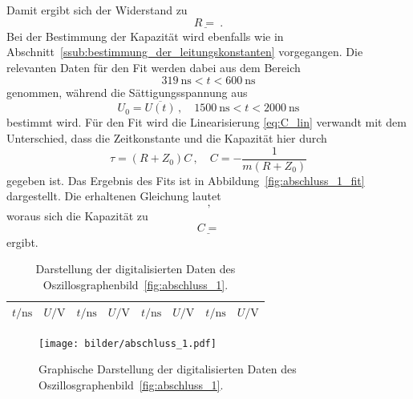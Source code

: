 Damit ergibt sich der Widerstand zu
\begin{equation}
  \underline{R = }~.
\end{equation}
Bei der Bestimmung der Kapazität wird ebenfalls wie in
Abschnitt~\ref{ssub:bestimmung_der_leitungskonstanten} vorgegangen.
Die relevanten Daten für den Fit werden dabei aus dem Bereich
\begin{equation}
  \SI{319}{\nano\second} < t < \SI{600}{\nano\second}
\end{equation}
genommen, während die Sättigungsspannung aus
\begin{equation}
  U_0 = \overline{U(t)}\,,\quad
  \SI{1500}{\nano\second} < t < \SI{2000}{\nano\second}
\end{equation}
bestimmt wird.
Für den Fit wird die Linearisierung \eqref{eq:C_lin} verwandt mit dem
Unterschied, dass die Zeitkonstante und die Kapazität hier durch
\begin{equation}
  \tau = (R + Z_0) C\,,\quad C = - \frac{1}{m (R + Z_0)}
\end{equation}
gegeben ist.
Das Ergebnis des Fits ist in Abbildung~\ref{fig:abschluss_1_fit} dargestellt.
Die erhaltenen Gleichung lautet
\begin{equation}
  ~,
\end{equation}
woraus sich die Kapazität zu
\begin{equation}
  \underline{C = }
\end{equation}
ergibt.

\begin{table}[htpb]
  \centering
  \begin{tabular}{cc|cc|cc|cc}
    \midrule
    \midrule
    $t/\si{\nano\second}$ & $U/\si{\volt}$ &
    $t/\si{\nano\second}$ & $U/\si{\volt}$ &
    $t/\si{\nano\second}$ & $U/\si{\volt}$ &
    $t/\si{\nano\second}$ & $U/\si{\volt}$ \\
    \midrule
    
    \midrule
    \midrule
  \end{tabular}
  \caption{Darstellung der digitalisierten Daten des Oszillosgraphenbild~\ref{fig:abschluss_1}.}
\label{tab:daten_abschluss_1}
\end{table}

\begin{figure}[htpb]
  \centering
  \texttt{[image: bilder/abschluss\_1.pdf]}
  \caption{Graphische Darstellung der digitalisierten Daten des
    Oszillosgraphenbild~\ref{fig:abschluss_1}.}
  \label{fig:abschluss_1_digitalisiert}
\end{figure}

